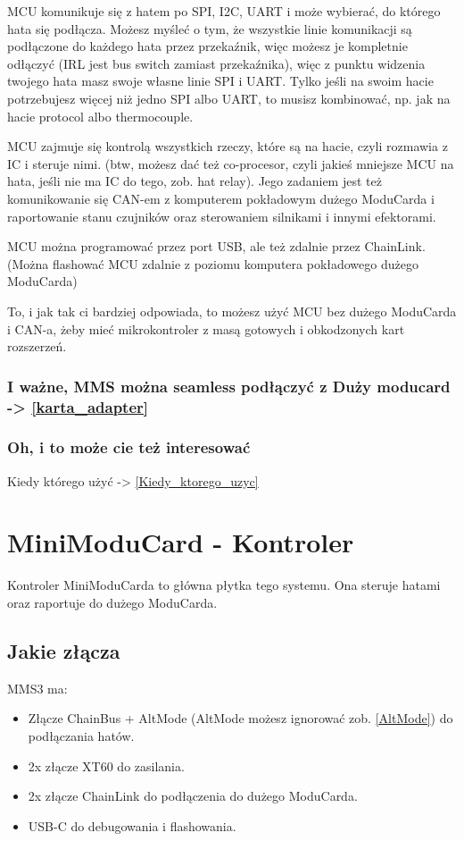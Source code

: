 \documentclass[b5paper, 10pt, twoside]{book}
\begin{document}
MCU komunikuje się z hatem po SPI, I2C, UART i może wybierać, do którego hata się podłącza. Możesz myśleć o tym, że wszystkie linie komunikacji są podłączone do każdego hata przez przekaźnik, więc możesz je kompletnie odłączyć (IRL jest bus switch zamiast przekaźnika), więc z punktu widzenia twojego hata masz swoje własne linie SPI i UART. Tylko jeśli na swoim hacie potrzebujesz więcej niż jedno SPI albo UART, to musisz kombinować, np. jak na hacie protocol albo thermocouple.

MCU zajmuje się kontrolą wszystkich rzeczy, które są na hacie, czyli rozmawia z IC i steruje nimi. (btw, możesz dać też co-procesor, czyli jakieś mniejsze MCU na hata, jeśli nie ma IC do tego, zob. hat relay). Jego zadaniem jest też komunikowanie się CAN-em z komputerem pokładowym dużego ModuCarda i raportowanie stanu czujników oraz sterowaniem silnikami i innymi efektorami.

MCU można programować przez port USB, ale też zdalnie przez ChainLink. (Można flashować MCU zdalnie z poziomu komputera pokładowego dużego ModuCarda)

To, i jak tak ci bardziej odpowiada, to możesz użyć MCU bez dużego ModuCarda i CAN-a, żeby mieć mikrokontroler z masą gotowych i obkodzonych kart rozszerzeń.

\subsubsection{I ważne, MMS można seamless podłączyć z Duży moducard -> \ref{karta_adapter}}

\subsubsection{Oh, i to może cie też interesować}
Kiedy którego użyć -> \ref{Kiedy_ktorego_uzyc}

\section{MiniModuCard - Kontroler}

Kontroler MiniModuCarda to główna płytka tego systemu. Ona steruje hatami oraz raportuje do dużego ModuCarda.

\subsection{Jakie złącza}
MMS3 ma:
\begin{itemize}
  \item Złącze ChainBus + AltMode (AltMode możesz ignorować zob. \ref{AltMode}) do podłączania hatów.
  \item 2x złącze XT60 do zasilania.
  \item 2x złącze ChainLink do podłączenia do dużego ModuCarda.
  \item USB-C do debugowania i flashowania.
\end{itemize}
\end{document}
